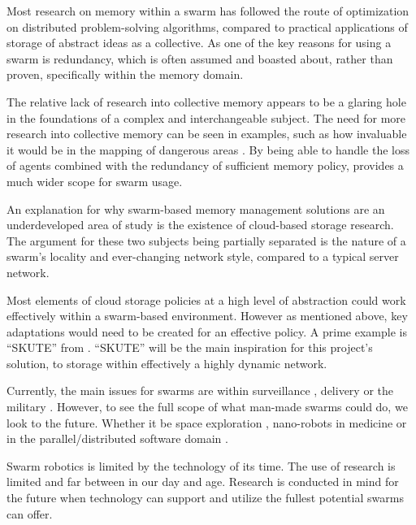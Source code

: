 \documentclass{UoYCSproject}
\begin{document}
Most research on memory within a swarm has followed the route of optimization on distributed problem-solving algorithms, compared to practical applications of storage of abstract ideas as a collective.
As one of the key reasons for using a swarm is redundancy, which is often assumed and boasted about, rather than proven, specifically within the memory domain.

The relative lack of research into collective memory appears to be a glaring hole in the foundations of a complex and interchangeable subject.
The need for more research into collective memory can be seen in examples, such as how invaluable it would be in the mapping of dangerous areas \cite{Cognitive maps mine detection}.
By being able to handle the loss of agents combined with the redundancy of sufficient memory policy, provides a much wider scope for swarm usage.

An explanation for why swarm-based memory management solutions are an underdeveloped area of study is the existence of cloud-based storage research.
The argument for these two subjects being partially separated is the nature of a swarm's locality and ever-changing network style, compared to a typical server network.


Most elements of cloud storage policies at a high level of abstraction could work effectively within a swarm-based environment.
However as mentioned above, key adaptations would need to be created for an effective policy.
A prime example is “SKUTE” from \cite{Distributed Storage}.
“SKUTE” will be the main inspiration for this project's solution, to storage within effectively a highly dynamic network.

Currently, the main issues for swarms are within surveillance \cite{UAV, HiveMind}, delivery or the military \cite{Swarm robotics reviewed}.
However, to see the full scope of what man-made swarms could do, we look to the future.
Whether it be space exploration \cite{Space exploration}, nano-robots in medicine or in the parallel/distributed software domain \cite{blockchainandSwarm}.

Swarm robotics is limited by the technology of its time.
The use of research is limited and far between in our day and age.
Research is conducted in mind for the future when technology can support and utilize the fullest potential swarms can offer.







\end{document}
